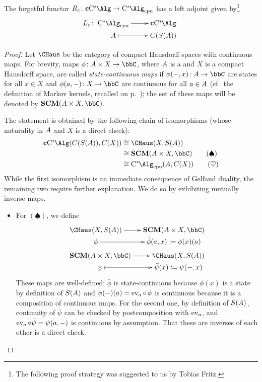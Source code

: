 \begin{proposition}\label{prop:state_space_leftadjoint}
	The forgetful functor $R_c\colon \cCalg \to \Calgcpu$ has a left adjoint given by\footnote{The following proof strategy was suggested to us by Tobias Fritz.}
	\[
		L_c\colon \xymatrix@R=.1em{
		\Calgcpu \ar[r]
		& \cCalg \\
		\A  \ar@{|->}[r]
		& C(S(\A))
		}
	\]
\end{proposition}
\begin{proof}
	Let $\CHaus$ be the category of compact Hausdorff spaces with continuous maps.
	For brevity, maps $\phi\colon \A \times X\to \bbC$, where ${A}$ is a \cstar{} and $X$ is a compact Hausdorff space, are called \emph{state-continuous maps} if $\phi(-,x)\colon \A \to \bbC$ are states for all $x \in X$ and $\phi(a,-)\colon X\to \bbC$ are continuous for all $a\in {A}$  (cf.\ the definition of Markov kernels, recalled on p.~\pageref{def:mkernel}); the set of these maps will be denoted by $\mathbf{SCM}(\A\times X,\bbC)$.

	The statement is obtained by the following chain of isomorphisms (whose naturality in ${A}$ and $X$ is a direct check):
	\begin{align*}
		\cCalg (C(S(\A)),C(X)) & \cong \CHaus(X,S(\A))                                        \\
		                       & \cong \mathbf{SCM}(\A\times X,\bbC) \tag{$\spadesuit$} \\
		                       & \cong \Calgcpu(\A,C(X)) \tag{$\heartsuit$}
	\end{align*}
	While the first isomorphism is an immediate consequence of Gelfand duality, the remaining two require further explanation.
	We do so by exhibiting mutually inverse maps.
	\begin{itemize}
		\item For $(\spadesuit)$, we define
		      \[\begin{gathered}
			      \xymatrix@R=.1pt{
			      \CHaus(X,S(\A)) \ar[r]
			      & \mathbf{SCM}(\A\times X,\bbC) \\
			      \phi  \ar@{|->}[r]
			      & \bar{\phi}(a,x)\coloneqq \phi(x)(a)
			      } \\
			      \xymatrix@R=.1pt{
			      \mathbf{SCM}(\A\times X,\bbC)  \ar[r]
			      & \CHaus(X,S(\A)) \\
			      \psi  \ar@{|->}[r]
			      & \bar{\psi}(x)\coloneqq  \psi(-,x)
			      }
								\end{gathered}\]
		      These maps are well-defined: $\bar{\phi}$ is state-continuous because $\phi(x)$ is a state by definition of $S({A})$ and $\phi(-)(a)=\operatorname{ev}_a\circ\, \phi$ is continuous because it is a composition of continuous maps. For the second one, by definition of $S({A})$, continuity of $\bar{\psi}$ can be checked by postcomposition with $\operatorname{ev}_a$, and $\operatorname{ev}_a \circ \bar{\psi} = \psi(a,-)$ is continuous by assumption.
		      That these are inverses of each other is a direct check.


\end{itemize}
\end{proof}
